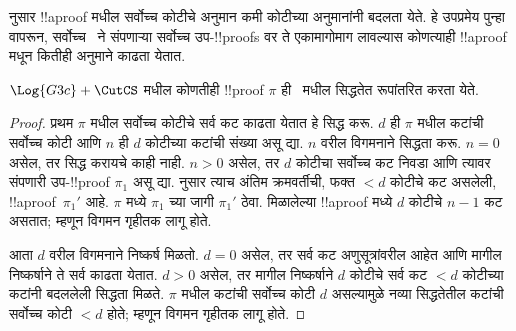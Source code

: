 \documentclass[../../../include/open-logic-section]{subfiles}
\begin{document}
 नुसार
!!a{proof} मधील सर्वोच्च कोटीचे
\CutCS{} अनुमान कमी कोटीच्या
\CutCS{} अनुमानांनी बदलता येते.
हे उपप्रमेय पुन्हा वापरून,
सर्वोच्च~\CutCS{} ने संपणाऱ्या
सर्वोच्च उप-!!{proof}s वर ते एकामागोमाग
लावल्यास कोणत्याही !!a{proof} मधून कितीही
\CutCS{} अनुमाने काढता येतात.

\begin{thm}
$\Log{G3c} + \CutCS$ मधील कोणतीही
!!{proof} $\pi$ ही~ मधील
सिद्धतेत रूपांतरित करता येते.
\end{thm}

\begin{proof}
  प्रथम $\pi$ मधील सर्वोच्च कोटीचे
  सर्व कट काढता येतात हे सिद्ध करू.
  $d$ ही $\pi$ मधील कटांची सर्वोच्च
  कोटी आणि $n$ ही $d$ कोटीच्या कटांची
  संख्या असू द्या. $n$ वरील विगमनाने
  सिद्धता करू. $n=0$ असेल, तर
  सिद्ध करायचे काही नाही. $n>0$
  असेल, तर $d$ कोटीचा सर्वोच्च कट
  निवडा आणि त्यावर संपणारी उप-!!{proof}
  $\pi_1$ असू द्या.
   नुसार
  त्याच अंतिम क्रमवर्तीची, फक्त
  $<d$ कोटीचे कट असलेली,
  !!a{proof}~$\pi_1'$ आहे.
  $\pi$ मध्ये $\pi_1$ च्या जागी
  $\pi_1'$ ठेवा. मिळालेल्या
  !!a{proof} मध्ये $d$ कोटीचे
  $n-1$ कट असतात; म्हणून
  विगमन गृहीतक लागू होते.

आता $d$ वरील विगमनाने निष्कर्ष
मिळतो. $d=0$ असेल, तर सर्व कट
अणुसूत्रांवरील आहेत आणि मागील
निष्कर्षाने ते सर्व काढता येतात.
$d>0$ असेल, तर मागील निष्कर्षाने
$d$ कोटीचे सर्व कट $<d$ कोटीच्या
कटांनी बदललेली सिद्धता मिळते.
$\pi$ मधील कटांची सर्वोच्च कोटी
$d$ असल्यामुळे नव्या सिद्धतेतील
कटांची सर्वोच्च कोटी $<d$ होते;
म्हणून विगमन गृहीतक लागू होते.
\end{proof}
\end{document}
